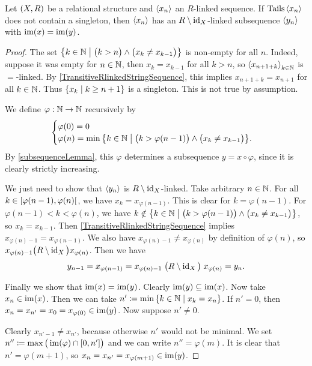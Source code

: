 \begin{proposition} \label{RlinkedSequenceHasStrictSubsequence}
Let $\sSet{X,R}$ be a relational structure and $\left\langle x_n \right\rangle$ an $R$-linked sequence. If $\operatorname{Tails}\left\langle x_n \right\rangle$ does not contain a singleton, then $\left\langle x_n \right\rangle$ has an $R\setminus \operatorname{id}_X$-linked subsequence $\left\langle y_n \right\rangle$ with $\operatorname{im}(x) = \operatorname{im}(y)$.
\end{proposition}
\begin{proof}
The set $\setbuilder{k\in \N}{\big(k > n\big)\land \big(x_k \neq x_{k-1}\big)}$ is non-empty for all $n$. Indeed, suppose it was empty for $n\in \mathbb{N}$, then $x_k = x_{k-1}$ for all $k > n$, so $\left\langle x_{n+1+k} \right\rangle_{k\in \mathbb{N}}$ is $=$-linked. By \ref{TransitiveRlinkedStringSequence}, this implies $x_{n+1+k} = x_{n+1}$ for all $k\in \mathbb{N}$.
Thus $\setbuilder{x_k}{k \geq n+1}$ is a singleton. This is not true by assumption.

We define $\varphi: \mathbb{N} \to \mathbb{N}$ recursively by
\[ \begin{cases}
\varphi(0) = 0 \\
\varphi(n) = \min \setbuilder{k\in \N}{\big(k > \varphi(n-1)\big)\land \big(x_k \neq x_{k-1}\big)}.
\end{cases} \]
By \ref{subsequenceLemma}, this $\varphi$ determines a subsequence $y = x\circ \varphi$, since it is clearly strictly increasing.

We just need to show that $\left\langle y_n \right\rangle$ is $R\setminus \operatorname{id}_X$-linked. Take arbitrary $n\in \mathbb{N}$. For all $k\in \interval[co]{\varphi(n-1), \varphi(n)}$, we have $x_{k} = x_{\varphi(n-1)}$. This is clear for $k = \varphi(n-1)$. For $\varphi(n-1) < k < \varphi(n)$, we have $k\notin \setbuilder{k\in \N}{\big(k > \varphi(n-1)\big)\land \big(x_k \neq x_{k-1}\big)}$, so $x_k = x_{k-1}$. Then \ref{TransitiveRlinkedStringSequence} implies $x_{\varphi(n)-1} = x_{\varphi(n-1)}$. We also have $x_{\varphi(n)-1} \neq x_{\varphi(n)}$ by definition of $\varphi(n)$, so $x_{\varphi(n)-1} \big(R\setminus \operatorname{id}_X\big) x_{\varphi(n)}$. Then we have
\[ y_{n-1} = x_{\varphi(n-1)} = x_{\varphi(n)-1} \mathrel{\big(R\setminus \operatorname{id}_X\big)} x_{\varphi(n)} = y_n.  \]

Finally we show that $\operatorname{im}(x) = \operatorname{im}(y)$. Clearly $\operatorname{im}(y) \subseteq \operatorname{im}(x)$. Now take $x_n \in \operatorname{im}(x)$. Then we can take $n' \defeq \min\setbuilder{k\in\N}{x_k = x_n}$. If $n' = 0$, then $x_n = x_{n'} = x_0 = x_{\varphi(0)} \in \operatorname{im}(y)$. Now suppose $n'\neq 0$.

Clearly $x_{n'-1}\neq x_{n'}$, because otherwise $n'$ would not be minimal. We set $n'' \defeq \max\big(\im(\varphi)\cap \interval{0,n'}\big)$ and we can write $n'' = \varphi(m)$.
It is clear that $n' = \varphi(m+1)$, so $x_n = x_{n'} = x_{\varphi(m+1)} \in \operatorname{im}(y)$.
\end{proof}

